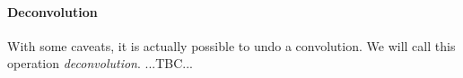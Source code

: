 





\paragraph{Deconvolution}
With some caveats, it is actually possible to undo a convolution. We will call this operation \emph{deconvolution}. ...TBC...



